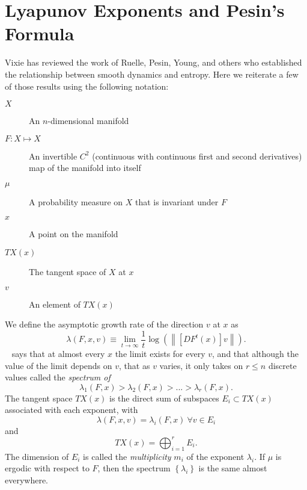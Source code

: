 \section{Lyapunov Exponents and Pesin's Formula}
\label{sec:PesinFormula}

Vixie\cite{vixie02} has reviewed the work of
Ruelle\cite{ruelle-1978-1}, Pesin\cite{pesin77},
Young\cite{young95-1}, and others who established the relationship
between smooth dynamics and entropy.  Here we reiterate a few of those
results using the following notation:
\begin{description}
\item[$X$] An $n$-dimensional manifold
\item[$F:X\mapsto X$] An invertible $C^2$ (continuous with continuous
  first and second derivatives) map of the manifold into itself
\item[$\mu$] A probability measure on $X$ that is invariant under $F$
\item[$x$] A point on the manifold
\item[$TX(x)$] The tangent space of $X$ at $x$
\item[$v$] An element of $TX(x)$
\end{description}

We define the asymptotic growth rate of the direction $v$ at $x$ as
\begin{equation}
  \label{eq:growthVX}
  \lambda(F,x,v) \equiv \lim_{t\rightarrow \infty} \frac{1}{t} \log
  \left( \left\| [DF^t(x)] v \right\| \right).
\end{equation}
 ~\cite{young95-1,katok95, mane87} says
that at almost every $x$ the limit exists for every $v$, and that
although the value of the limit depends on $v$, that as $v$ varies, it
only takes on $r \leq n$ discrete values called the \emph{spectrum of
  }
\begin{equation}
  \label{eq:LyapunovSpectrum}
  \lambda_1(F,x) > \lambda_2(F,x) > ... > \lambda_r(F,x).
\end{equation}
The tangent space $TX(x)$ is the direct sum of subspaces $E_i \subset
TX(x)$ associated with each exponent, with
\begin{equation*}
  \lambda(F,x,v) = \lambda_i(F,x) ~ \forall v \in E_i
\end{equation*}
and
\begin{equation*}
  TX(x) = \bigoplus_{i=1}^r E_i. %
\end{equation*}
The dimension of $E_i$ is called the \emph{multiplicity} $m_i$ of the
exponent $\lambda_i$. If $\mu$ is ergodic with respect to $F$, then
the spectrum $\left\{ \lambda_i \right\}$ is the same almost
everywhere.

